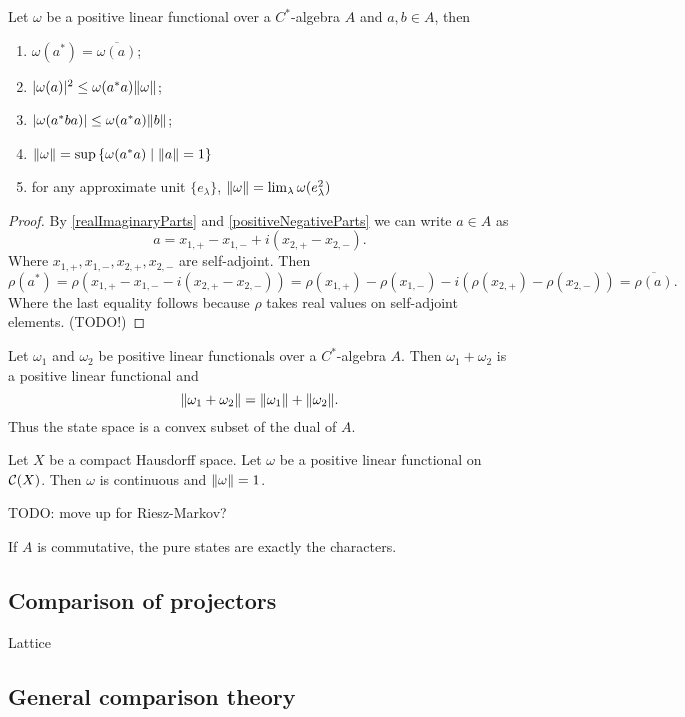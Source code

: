 \begin{proposition}
Let $\omega$ be a positive linear functional over a $C^*$-algebra $A$ and $a,b\in A$, then
\begin{enumerate}
\item $\omega(a^*) = \overline{\omega(a)}$;
\item $|\omega(a)|^2 \leq \omega(a^*a)\lVert\omega\rVert$;
\item $|\omega(a^*ba)| \leq \omega(a^*a)\lVert b\rVert$;
\item $\lVert\omega\rVert = \sup\left\{ \omega(a^*a) \;\middle|\; \lVert a\rVert = 1 \right\}$
\item for any approximate unit $\{e_\lambda\}$, $\lVert\omega\rVert = \lim_\lambda\omega(e_\lambda^2)$
\end{enumerate}
\end{proposition}
\begin{proof}
By \ref{realImaginaryParts} and \ref{positiveNegativeParts} we can write $a\in A$ as
\[ a = x_{1,+} - x_{1,-} + i(x_{2,+} - x_{2,-}).\]
Where $x_{1,+}, x_{1,-}, x_{2,+}, x_{2,-}$ are self-adjoint. Then
\[ \rho(a^*) = \rho(x_{1,+} - x_{1,-} - i(x_{2,+} - x_{2,-})) = \rho(x_{1,+}) - \rho(x_{1,-}) - i(\rho(x_{2,+}) - \rho(x_{2,-})) = \overline{\rho(a)}. \]
Where the last equality follows because $\rho$ takes real values on self-adjoint elements. (TODO!)
\end{proof}
\begin{corollary}
Let $\omega_1$ and $\omega_2$ be positive linear functionals over a $C^*$-algebra $A$. Then $\omega_1+\omega_2$ is a positive linear functional and
\[ \lVert\omega_1+\omega_2\rVert = \lVert\omega_1\rVert + \lVert\omega_2\rVert. \]
Thus the state space is a convex subset of the dual of $A$.
\end{corollary}
\begin{corollary}
Let $X$ be a compact Hausdorff space. Let $\omega$ be a positive linear functional on $\operatorname{\mathcal{C}}(X)$. Then $\omega$ is continuous and $\lVert\omega\rVert = 1$.
\end{corollary}
TODO: move up for Riesz-Markov?

\begin{proposition}
If $A$ is commutative, the pure states are exactly the characters.
\end{proposition}

\subsection{Comparison of projectors}
Lattice
\subsection{General comparison theory}

